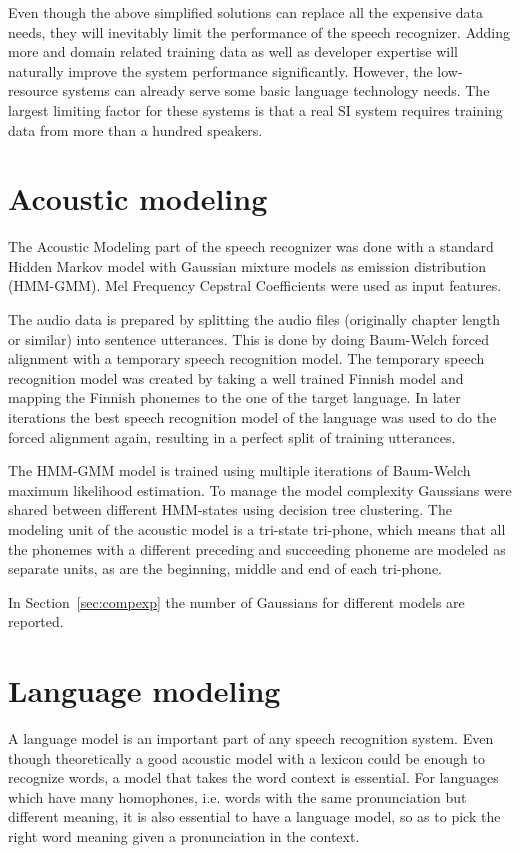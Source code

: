 \documentclass[b5paper]{article}
\begin{document}
Even though the above simplified solutions can replace all the expensive data needs, they will inevitably limit the performance of the speech recognizer. Adding more and domain related training data as well as developer expertise will naturally improve the system performance significantly. However, the low-resource systems can already serve some basic language technology needs. The largest limiting factor for these systems is that a real SI system requires training data from more than a hundred speakers.


\section{Acoustic modeling}
\label{sec:align}
The Acoustic Modeling part of the speech recognizer was done with a standard Hidden Markov model with Gaussian mixture models as emission distribution (HMM-GMM). Mel Frequency Cepstral Coefficients were used as input features. \cite{hirsimaki2009importance}

The audio data is prepared by splitting the audio files (originally chapter length or similar) into sentence utterances. This is done by doing Baum-Welch forced alignment with a temporary speech recognition model. The temporary speech recognition model was created by taking a well trained Finnish model and mapping the Finnish phonemes to the one of the target language. In later iterations the best speech recognition model of the language was used to do the forced alignment again, resulting in a perfect split of training utterances.

The HMM-GMM model is trained using multiple iterations of Baum-Welch maximum likelihood estimation. To manage the model complexity Gaussians were shared between different HMM-states using decision tree clustering. The modeling unit of the acoustic model is a tri-state tri-phone, which means that all the phonemes with a different preceding and succeeding phoneme are modeled as separate units, as are the beginning, middle and end of each tri-phone.

In Section~\ref{sec:compexp} the number of Gaussians for different models are reported.


\section{Language modeling}

A language model is an important part of any speech recognition system. Even though theoretically a good acoustic model with a lexicon could be enough to recognize words, a model that takes the word context is essential. For languages which have many homophones, i.e. words with the same pronunciation but different meaning, it is also essential to have a language model, so as to pick the right word meaning given a pronunciation in the context. 
\end{document}
